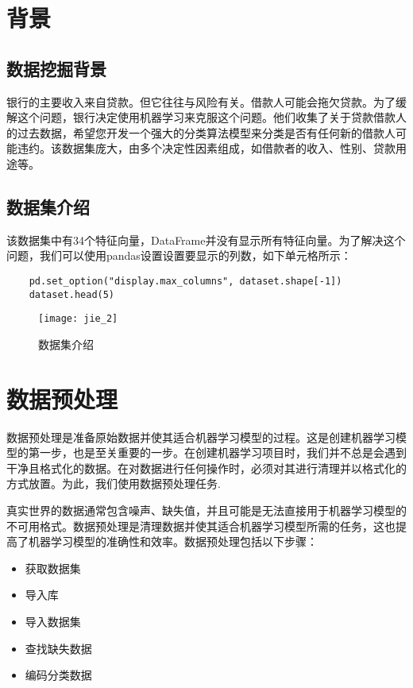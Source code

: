 \documentclass[withoutpreface,bwprint]{cumcmthesis} %
\title{}
\begin{document}
	
	
	 
	\newpage
	
	\tableofcontents
	
	\newpage
	\section{背景}
	\subsection{数据挖掘背景}
	\par 银行的主要收入来自贷款。但它往往与风险有关。借款人可能会拖欠贷款。为了缓解这个问题，银行决定使用机器学习来克服这个问题。他们收集了关于贷款借款人的过去数据，希望您开发一个强大的分类算法模型来分类是否有任何新的借款人可能违约。该数据集庞大，由多个决定性因素组成，如借款者的收入、性别、贷款用途等。
	
	\subsection{数据集介绍}
	\par 该数据集中有34个特征向量，DataFrame并没有显示所有特征向量。为了解决这个问题，我们可以使用pandas设置设置要显示的列数，如下单元格所示：
	
	\begin{lstlisting}
	pd.set_option("display.max_columns", dataset.shape[-1]) 
	dataset.head(5)
	\end{lstlisting}

	\begin{figure}[H]
		\centering
		\centerline{\texttt{[image: jie\_2]}}  
		\begin{center}
			\caption{数据集介绍}
		\end{center}
	\end{figure}
	
	\section{数据预处理}
	\par 数据预处理是准备原始数据并使其适合机器学习模型的过程。这是创建机器学习模型的第一步，也是至关重要的一步。在创建机器学习项目时，我们并不总是会遇到干净且格式化的数据。在对数据进行任何操作时，必须对其进行清理并以格式化的方式放置。为此，我们使用数据预处理任务.
	\par 真实世界的数据通常包含噪声、缺失值，并且可能是无法直接用于机器学习模型的不可用格式。数据预处理是清理数据并使其适合机器学习模型所需的任务，这也提高了机器学习模型的准确性和效率。数据预处理包括以下步骤：	
	\begin{itemize}
		\item 获取数据集
		\item 导入库
		\item 导入数据集
		\item 查找缺失数据
		\item 编码分类数据
	\end{itemize}
	
\end{document}
